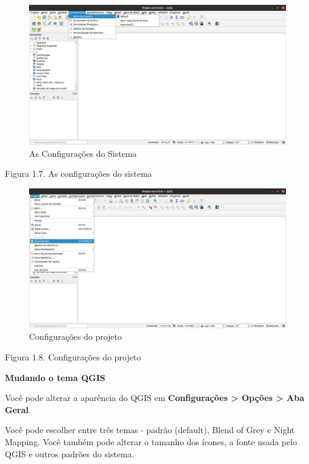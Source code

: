 \documentclass[
]{krantz}
\begin{document}
\begin{figure}
\centering
\includegraphics{media/modulo1/settings-1.png}
\caption{As Configurações do Sistema}
\end{figure}

Figura 1.7. As configurações do sistema

\begin{figure}
\centering
\includegraphics{media/modulo1/settings-2.png}
\caption{Configurações do projeto}
\end{figure}

Figura 1.8. Configurações do projeto

\textbf{Mudando o tema QGIS}

Você pode alterar a aparência do QGIS em \textbf{Configurações \textgreater{} Opções \textgreater{} Aba Geral}.

Você pode escolher entre três temas - padrão (default), Blend of Grey e Night Mapping. Você também pode alterar o tamanho dos ícones, a fonte usada pelo QGIS e outros padrões do sistema.
\end{document}
